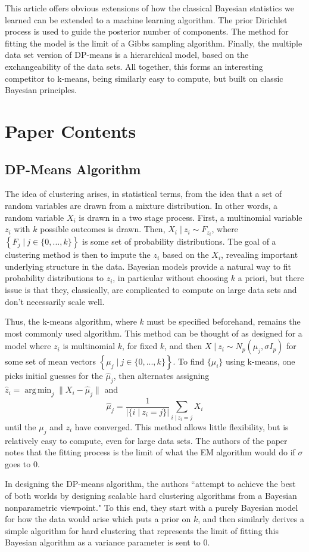 \documentclass[11pt]{article}
\newcommand{\st}{ \; \big | \:}
\theoremstyle{definition}
\DeclareMathOperator*{\argmin}{arg\,min}
\begin{document}
This article offers obvious extensions of how the classical Bayesian statistics we learned can be extended to a machine learning algorithm. The prior Dirichlet process is used to guide the posterior number of components. The method for fitting the model is the limit of a Gibbs sampling algorithm. Finally, the multiple data set version of DP-means is a hierarchical model, based on the exchangeability of the data sets. All together, this forms an interesting competitor to k-means, being similarly easy to compute, but built on classic Bayesian principles.

\section{Paper Contents}
\subsection{DP-Means Algorithm}
The idea of clustering arises, in statistical terms, from the idea that a set of random variables are drawn from a mixture distribution. In other words, a random variable $X_i$ is drawn in a two stage process. First, a multinomial variable $z_i$ with $k$ possible outcomes is drawn. Then, $X_i\st z_i\sim F_{z_i}$, where \(\left\{F_j\st j\in\{0,...,k\}\right\}\) is some set of probability distributions. The goal of a clustering method is then to impute the $z_i$ based on the $X_i$, revealing important underlying structure in the data. Bayesian models provide a natural way to fit probability distributions to $z_i$, in particular without choosing $k$ a priori, but there issue is that they, classically, are complicated to compute on large data sets and don't necessarily scale well. \par
Thus, the k-means algorithm, where $k$ must be specified beforehand, remains the most commonly used algorithm. This method can be thought of as designed for a model where $z_i$ is multinomial $k$, for fixed $k$, and then $X\st z_i \sim N_p(\mu_j,\sigma I_p)$ for some set of mean vectors \(\left\{\mu_j\st j\in\{0,...,k\}\right\}\). To find $\{\mu_i\}$ using k-means, one picks initial guesses for the $\hat\mu_j$, then alternates assigning \(\hat z_i = \argmin_j \|X_i - \hat\mu_j\|\) and 
\[\hat\mu_j = \frac{1}{\big | \{i\st z_i=j\} \big |}\sum_{i\st z_i=j }X_i \] 
until the $\mu_j$ and $z_i$ have converged. This method allows little flexibility, but is relatively easy to compute, even for large data sets. The authors of the paper notes that the fitting process is the limit of what the EM algorithm would do if $\sigma$ goes to 0. \par

In designing the DP-means algorithm, the authors ``attempt to achieve the best of both worlds by designing scalable hard clustering algorithms from a Bayesian nonparametric viewpoint." To this end, they start with a purely Bayesian model for how the data would arise which puts a prior on $k$, and then similarly derives a simple algorithm for hard clustering that represents the limit of fitting this Bayesian algorithm as a variance parameter is sent to 0. 
\end{document}
